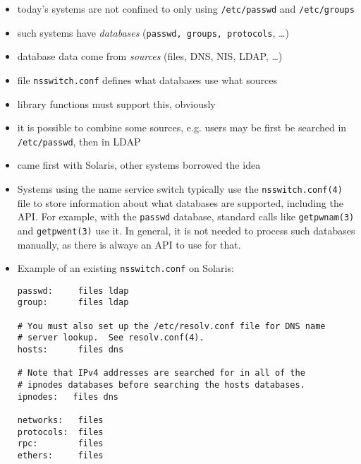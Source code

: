 \begin{slide}
\begin{itemize}
\item today's systems are not confined to only using
\texttt{/etc/passwd} and \texttt{/etc/groups}
\item such systems have \emph{databases} (\texttt{passwd, groups, protocols},
\dots)
\item database data come from \emph{sources} (files, DNS, NIS, LDAP, \dots)
\item file \texttt{nsswitch.conf} defines what databases use what sources
\item library functions must support this, obviously
\item it is possible to combine some sources, e.g. users may be first be searched
in \texttt{/etc/passwd}, then in LDAP
\item came first with Solaris, other systems borrowed the idea
\end{itemize}
\end{slide}

\label{name_service_switch}

\begin{itemize}
\item Systems using the name service switch typically use the
\texttt{nsswitch.conf(4)} file to store information about what databases
are supported, including the API.  For example, with the \texttt{passwd}
database, standard calls like \texttt{getpwnam(3)} and \texttt{getpwent(3)} use
it.  In general, it is not needed to process such databases manually, as there is
always an API to use for that.
\item Example of an existing \texttt{nsswitch.conf} on Solaris:

\begin{verbatim}
passwd:     files ldap
group:      files ldap

# You must also set up the /etc/resolv.conf file for DNS name
# server lookup.  See resolv.conf(4).
hosts:      files dns

# Note that IPv4 addresses are searched for in all of the
# ipnodes databases before searching the hosts databases.
ipnodes:   files dns

networks:   files
protocols:  files
rpc:        files
ethers:     files
\end{verbatim}
\end{itemize}


